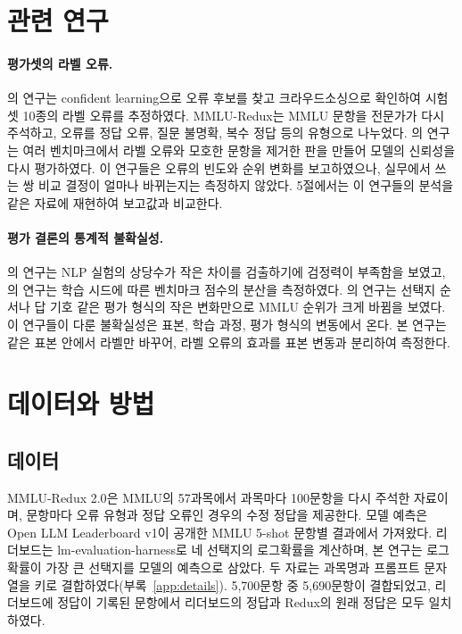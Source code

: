 \documentclass[11pt]{article}
\begin{document}
\section{관련 연구}

\paragraph{평가셋의 라벨 오류.}
\citet{northcutt2021pervasive}의 연구는 confident learning으로 오류 후보를 찾고 크라우드소싱으로 확인하여 시험셋 10종의 라벨 오류를 추정하였다. MMLU-Redux\citep{gema-etal-2025-done}는 MMLU 문항을 전문가가 다시 주석하고, 오류를 정답 오류, 질문 불명확, 복수 정답 등의 유형으로 나누었다. \citet{vendrow2025platinum}의 연구는 여러 벤치마크에서 라벨 오류와 모호한 문항을 제거한 판을 만들어 모델의 신뢰성을 다시 평가하였다. 이 연구들은 오류의 빈도와 순위 변화를 보고하였으나, 실무에서 쓰는 쌍 비교 결정이 얼마나 바뀌는지는 측정하지 않았다. 5절에서는 이 연구들의 분석을 같은 자료에 재현하여 보고값과 비교한다.

\paragraph{평가 결론의 통계적 불확실성.}
\citet{card-etal-2020-little}의 연구는 NLP 실험의 상당수가 작은 차이를 검출하기에 검정력이 부족함을 보였고, \citet{madaan2024variance}의 연구는 학습 시드에 따른 벤치마크 점수의 분산을 측정하였다. \citet{alzahrani-etal-2024-benchmarks}의 연구는 선택지 순서나 답 기호 같은 평가 형식의 작은 변화만으로 MMLU 순위가 크게 바뀜을 보였다. 이 연구들이 다룬 불확실성은 표본, 학습 과정, 평가 형식의 변동에서 온다. 본 연구는 같은 표본 안에서 라벨만 바꾸어, 라벨 오류의 효과를 표본 변동과 분리하여 측정한다.

\section{데이터와 방법}

\subsection{데이터}
MMLU-Redux 2.0\citep{gema-etal-2025-done}은 MMLU의 57과목에서 과목마다 100문항을 다시 주석한 자료이며, 문항마다 오류 유형과 정답 오류인 경우의 수정 정답을 제공한다. 모델 예측은 Open LLM Leaderboard v1\citep{beeching2023leaderboard}이 공개한 MMLU 5-shot 문항별 결과에서 가져왔다. 리더보드는 lm-evaluation-harness\citep{gao2023harness}로 네 선택지의 로그확률을 계산하며, 본 연구는 로그확률이 가장 큰 선택지를 모델의 예측으로 삼았다. 두 자료는 과목명과 프롬프트 문자열을 키로 결합하였다(부록~\ref{app:details}). 5,700문항 중 5,690문항이 결합되었고, 리더보드에 정답이 기록된 문항에서 리더보드의 정답과 Redux의 원래 정답은 모두 일치하였다.
\end{document}
